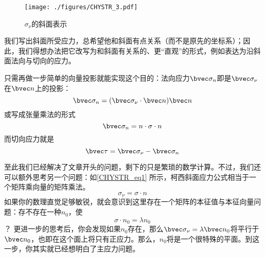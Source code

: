 \begin{figure}[ht]
\centering
\texttt{[image: ./figures/CHYSTR\_3.pdf]}
\caption{$\sigma_\nu$的斜面表示} \label{CHYSTR_fig3}
\end{figure}

我们写出斜面所受应力，总希望他和斜面有点关系（而不是原先的坐标系）；因此，我们得想办法把它改写为和斜面有关系的、更“直观”的形式，例如表达为沿斜面法向与切向的应力。

只需再做一步简单的向量投影就能实现这个目的：法向应力$\bvec \sigma_n$即是$\bvec \sigma_\nu$在$\bvec n$上的投影：
\begin{equation}
\bvec \sigma_n = (\bvec \sigma_\nu \cdot \bvec n) \bvec n
\end{equation}
或写成张量乘法的形式
\begin{equation}
\bvec \sigma_n = n \cdot \sigma \cdot n
\end{equation}
而切向应力就是
\begin{equation}
\bvec \tau = \bvec \sigma_\nu - \bvec \sigma_n
\end{equation}

至此我们已经解决了文章开头的问题，剩下的只是繁琐的数学计算。不过，我们还可以额外思考另一个问题：如\autoref{CHYSTR_eq1} 所示，柯西斜面应力公式相当于一个矩阵乘向量的矩阵乘法。
$$\sigma_\nu = \sigma \cdot n$$
如果你的数理直觉足够敏锐，就会意识到这里存在一个矩阵的本征值与本征向量问题：存不存在一种$n_0$，使
$$
\sigma \cdot n_0 = \lambda n_0
$$？
更进一步的思考后，你会发现如果$n_0$存在，那么$\bvec \sigma_\nu = \lambda \bvec n_0$将平行于$\bvec n_0$，也即在这个面上将只有正应力。那么，$n_0$将是一个很特殊的平面。到这一步，你其实就已经想明白了主应力问题。

